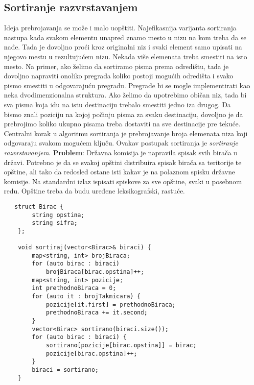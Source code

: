 \documentclass{article}
\begin{document}
\subsection{Sortiranje razvrstavanjem}
Ideja prebrojavanja se može i malo uopštiti. Najefikasnija varijanta sortiranja
nastupa kada svakom elementu unapred znamo mesto u nizu na kom treba da
se nađe. Tada je dovoljno proći kroz originalni niz i svaki element samo upisati
na njegovo mestu u rezultujućem nizu. Nekada više elemenata treba smestiti na
isto mesto. Na primer, ako želimo da sortiramo pisma prema odredištu, tada
je dovoljno napraviti onoliko pregrada koliko postoji mogućih odredišta i svako
pismo smestiti u odgovarajuću pregradu. Pregrade bi se mogle implementirati
kao neka dvodimenzionalna struktura. Ako želimo da upotrebimo običan niz,
tada bi sva pisma koja idu na istu destinaciju trebalo smestiti jedno iza drugog.
Da bismo znali poziciju na kojoj počinju pisma za svaku destinaciju, dovoljno
je da prebrojimo koliko ukupno pisama treba dostaviti na sve destinacije pre
tekuće. Centralni korak u algoritmu sortiranja je prebrojavanje broja
elemenata niza koji odgovaraju svakom mogućem ključu. Ovakav postupak
sortiranja je\textit{ sortiranje razvrstavanjem}. 
\vspace{0.1cm}\newline
\textbf{Problem}: Državna komisija je napravila spisak svih birača u državi. Potrebno
je da se svakoj opštini distribuira spisak birača sa teritorije te opštine, ali tako da
redosled ostane isti kakav je na polaznom spisku državne komisije. Na standardni
izlaz ispisati spiskove za sve opštine, svaki u posebnom redu. Opštine treba da
budu uređene leksikografski, rastuće.
\begin{lstlisting}
   struct Birac {
        string opstina;
        string sifra;
    };

    void sortiraj(vector<Birac>& biraci) {
        map<string, int> brojBiraca;
        for (auto birac : biraci)
            brojBiraca[birac.opstina]++;
        map<string, int> pozicije;
        int prethodnoBiraca = 0;
        for (auto it : brojTakmicara) {
            pozicije[it.first] = prethodnoBiraca;
            prethodnoBiraca += it.second;
        }
        vector<Birac> sortirano(biraci.size());
        for (auto birac : biraci) {
            sortirano[pozicije[birac.opstina]] = birac;
            pozicije[birac.opstina]++;
        }
        biraci = sortirano;
    }
\end{lstlisting}
\end{document}
